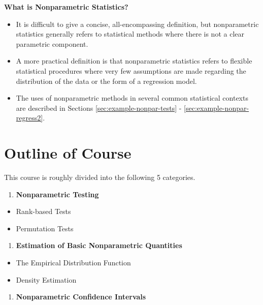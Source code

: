 \documentclass[]{book}
\providecommand{\tightlist}{%
  \setlength{\itemsep}{0pt}\setlength{\parskip}{0pt}}
\begin{document}
\textbf{What is Nonparametric Statistics?}

\begin{itemize}
\item
  It is difficult to give a concise, all-encompassing definition, but nonparametric
  statistics generally refers to statistical methods where there is not a clear parametric component.
\item
  A more practical definition is that nonparametric statistics refers to flexible statistical procedures where
  very few assumptions are made regarding the distribution of the data or the form
  of a regression model.
\item
  The uses of nonparametric methods in several common statistical contexts are described in Sections \ref{sec:example-nonpar-tests} - \ref{sec:example-nonpar-regress2}.
\end{itemize}

\hypertarget{sec:course-outline}{%
\section{Outline of Course}\label{sec:course-outline}}

This course is roughly divided into the following 5 categories.

\begin{enumerate}
\def\labelenumi{\arabic{enumi}.}
\tightlist
\item
  \textbf{Nonparametric Testing}
\end{enumerate}

\begin{itemize}
\tightlist
\item
  Rank-based Tests
\item
  Permutation Tests
\end{itemize}

\begin{enumerate}
\def\labelenumi{\arabic{enumi}.}
\tightlist
\item
  \textbf{Estimation of Basic Nonparametric Quantities}
\end{enumerate}

\begin{itemize}
\tightlist
\item
  The Empirical Distribution Function
\item
  Density Estimation
\end{itemize}

\begin{enumerate}
\def\labelenumi{\arabic{enumi}.}
\tightlist
\item
  \textbf{Nonparametric Confidence Intervals}
\end{enumerate}
\end{document}

